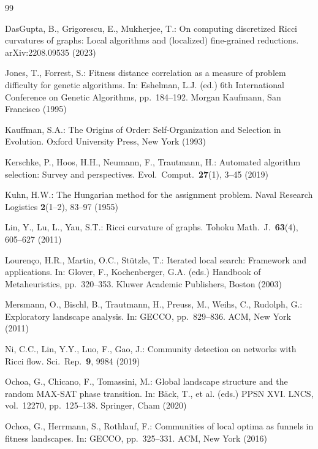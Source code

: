 \documentclass[runningheads]{llncs}
\begin{document}
\begin{thebibliography}{99}

DasGupta, B., Grigorescu, E., Mukherjee, T.: On computing discretized Ricci curvatures of graphs: Local algorithms and (localized) fine-grained reductions. arXiv:2208.09535 (2023)

Jones, T., Forrest, S.: Fitness distance correlation as a measure of problem difficulty for genetic algorithms. In: Eshelman, L.J. (ed.) 6th International Conference on Genetic Algorithms, pp.~184--192. Morgan Kaufmann, San Francisco (1995)

Kauffman, S.A.: The Origins of Order: Self-Organization and Selection in Evolution. Oxford University Press, New York (1993)

Kerschke, P., Hoos, H.H., Neumann, F., Trautmann, H.: Automated algorithm selection: Survey and perspectives. Evol.\ Comput.\ \textbf{27}(1), 3--45 (2019)

Kuhn, H.W.: The Hungarian method for the assignment problem. Naval Research Logistics \textbf{2}(1--2), 83--97 (1955)

Lin, Y., Lu, L., Yau, S.T.: Ricci curvature of graphs. Tohoku Math.\ J.\ \textbf{63}(4), 605--627 (2011)

Louren\c{c}o, H.R., Martin, O.C., St\"utzle, T.: Iterated local search: Framework and applications. In: Glover, F., Kochenberger, G.A. (eds.) Handbook of Metaheuristics, pp.~320--353. Kluwer Academic Publishers, Boston (2003)

Mersmann, O., Bischl, B., Trautmann, H., Preuss, M., Weihs, C., Rudolph, G.: Exploratory landscape analysis. In: GECCO, pp.~829--836. ACM, New York (2011)

Ni, C.C., Lin, Y.Y., Luo, F., Gao, J.: Community detection on networks with Ricci flow. Sci.\ Rep.\ \textbf{9}, 9984 (2019)

Ochoa, G., Chicano, F., Tomassini, M.: Global landscape structure and the random MAX-SAT phase transition. In: B\"ack, T., et al. (eds.) PPSN XVI. LNCS, vol.~12270, pp.~125--138. Springer, Cham (2020)

Ochoa, G., Herrmann, S., Rothlauf, F.: Communities of local optima as funnels in fitness landscapes. In: GECCO, pp.~325--331. ACM, New York (2016)


\end{thebibliography}
\end{document}
